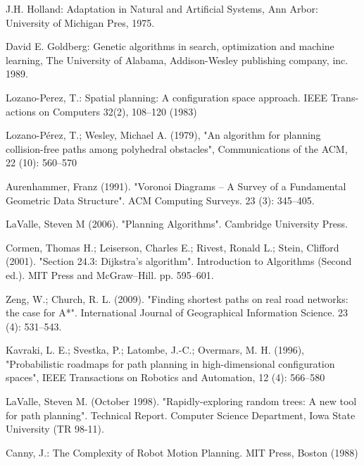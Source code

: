 \documentclass[12pt]{article} %
\begin{document}
\begin{thebibliography}{99} %


J.H. Holland: Adaptation in Natural and Artificial Systems, Ann Arbor: University of Michigan Pres, 1975.

David E. Goldberg: Genetic algorithms in search, optimization and machine learning, The University of Alabama, Addison-Wesley publishing company, inc. 1989.

Lozano-Perez, T.: Spatial planning: A configuration space approach. IEEE Trans-
actions on Computers 32(2), 108–120 (1983)

Lozano-Pérez, T.; Wesley, Michael A. (1979), "An algorithm for planning collision-free paths among polyhedral obstacles", Communications of the ACM, 22 (10): 560–570

Aurenhammer, Franz (1991). "Voronoi Diagrams – A Survey of a Fundamental Geometric Data Structure". ACM Computing Surveys. 23 (3): 345–405.

LaValle, Steven M (2006). "Planning Algorithms". Cambridge University Press.

Cormen, Thomas H.; Leiserson, Charles E.; Rivest, Ronald L.; Stein, Clifford (2001). "Section 24.3: Dijkstra's algorithm". Introduction to Algorithms (Second ed.). MIT Press and McGraw–Hill. pp. 595–601.

Zeng, W.; Church, R. L. (2009). "Finding shortest paths on real road networks: the case for A*". International Journal of Geographical Information Science. 23 (4): 531–543. 

Kavraki, L. E.; Svestka, P.; Latombe, J.-C.; Overmars, M. H. (1996), "Probabilistic roadmaps for path planning in high-dimensional configuration spaces", IEEE Transactions on Robotics and Automation, 12 (4): 566–580

LaValle, Steven M. (October 1998). "Rapidly-exploring random trees: A new tool for path planning". Technical Report. Computer Science Department, Iowa State University (TR 98-11).

Canny, J.: The Complexity of Robot Motion Planning. MIT Press, Boston (1988)


\end{thebibliography}
\end{document}
